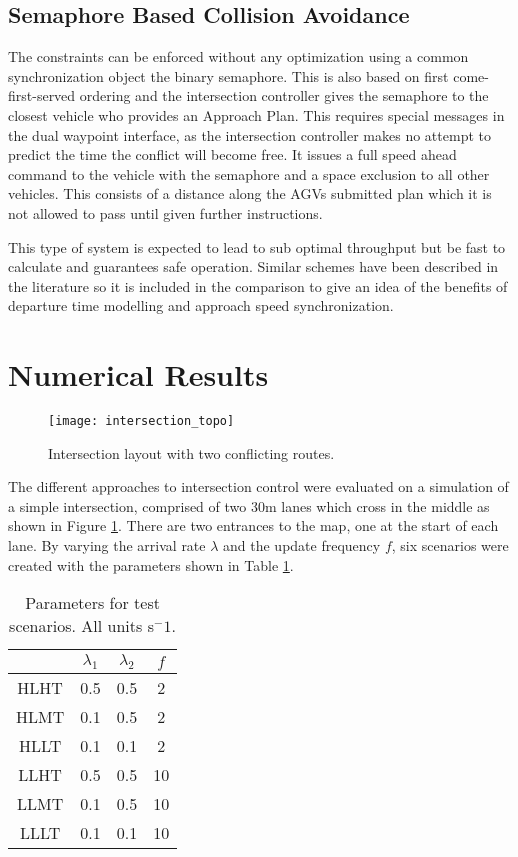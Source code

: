 \subsection{Semaphore Based Collision Avoidance}
The constraints can be enforced without any optimization using a common synchronization object the binary semaphore. This is also based on first come-first-served ordering and the intersection controller gives the semaphore to the closest vehicle who provides an Approach Plan. This requires special messages in the dual waypoint interface, as the intersection controller makes no attempt to predict the time the conflict will become free. It issues a full speed ahead command to the vehicle with the semaphore and a space exclusion to all other vehicles. This consists of a distance along the AGVs submitted plan which it is not allowed to pass until given further instructions. 

This type of system is expected to lead to sub optimal throughput but be fast to calculate and guarantees safe operation. Similar schemes have been described in the literature so it is included in the comparison to give an idea of the benefits of departure time modelling and approach speed synchronization. 

\section{Numerical Results}

\begin{figure}[ht]
	\centering
	\texttt{[image: intersection\_topo]}
	\caption{Intersection layout with two conflicting routes.}
	\label{fig:intersection_topo}
\end{figure}

The different approaches to intersection control were evaluated on a simulation of a simple intersection, comprised of two 30m lanes which cross in the middle as shown in Figure \ref{fig:intersection_topo}. There are two entrances to the map, one at the start of each lane. By varying the arrival rate $\lambda$ and the update frequency $f$, six scenarios were created with the parameters shown in Table \ref{tab:params}.
\begin{table}
	\begin{tabular}{|c|c|c|c|}
		\hline
		& $\lambda_1$ & $\lambda_2$ & $f$ \\
		\hline
		HLHT & 0.5 & 0.5 & 2 \\
		HLMT & 0.1 & 0.5 & 2 \\
		HLLT & 0.1 & 0.1 & 2 \\
		LLHT & 0.5 & 0.5 & 10 \\
		LLMT & 0.1 & 0.5 & 10 \\
		LLLT & 0.1 & 0.1 & 10 \\
		\hline
	\end{tabular}
	\label{tab:params}
	\caption{Parameters for test scenarios. All units s$^-1$. }
\end{table}

